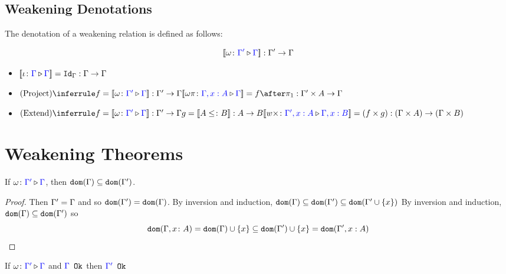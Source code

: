 \documentclass{report}
\begin{document}
\subsection{Weakening Denotations}
The denotation of a weakening relation is defined as follows:

\begin{equation}
    {\bf [\![}\omega \colon {\color{blue}\Gamma'} \triangleright {\color {blue} \Gamma}{\bf ]\!]}: \Gamma' \rightarrow \Gamma
\end{equation}

\begin{itemize}
    \item ${\bf [\![}\iota \colon {\color{blue}\Gamma} \triangleright {\color {blue} \Gamma}{\bf ]\!]} = \texttt{Id}_{\Gamma}: \Gamma \rightarrow \Gamma$
    
    \item $\ntreeruleI{Project}{f = \deno{\wrel{\w}{\G'}{\G}}: \G' \rightarrow \G}{\deno{\wrel{\w \pi}{\G, x: A}{\G}} = f\after \p: \G'\times A \rightarrow \G}$
    
    \item $\ntreeruleII{Extend}{f = \deno{\wrel{\w}{\G'}{\G}}: \G' \rightarrow \G }{ g = \deno{A \subtype B}: A \rightarrow B}{\deno{\wrel{w \x}{\G', x: A}{\G, x: B}} = (f\times g): (\G\times A)\rightarrow(\G\times B)}$
\end{itemize}

\section{Weakening Theorems}

\begin{lemma}
    If $\omega \colon {\color{blue}\Gamma'} \triangleright {\color {blue} \Gamma}$, then $\texttt{dom}(\Gamma)\subseteq \texttt{dom}(\Gamma')$.
\end{lemma}



\begin{framed}
    \begin{proof}
        Then $\Gamma' = \Gamma$ and so $\texttt{dom}(\Gamma') = \texttt{dom}(\Gamma)$.
        By inversion and induction, $\texttt{dom}(\Gamma)\subseteq\texttt{dom}(\Gamma')\subseteq\texttt{dom}(\Gamma'\cup\left\{x\right\})$
        By inversion and induction, $\texttt{dom}(\Gamma)\subseteq\texttt{dom}(\Gamma')$ so 
        $$\texttt{dom}(\Gamma, x\colon A) = \texttt{dom}(\Gamma)\cup\left\{x\right\} \subseteq\texttt{dom}(\Gamma')\cup\left\{x\right\} = \texttt{dom}(\Gamma',x:A)$$
    \end{proof}
\end{framed}


\begin{theorem}[Ok Preservation]\label{WeakeningPropertyOne}
    If $\omega \colon {\color{blue}\Gamma'} \triangleright {\color {blue} \Gamma}$ and ${\color{blue} \Gamma} \texttt{ Ok}$ then ${\color{blue} \Gamma'} \texttt{ Ok}$  
\end{theorem}
\end{document}
